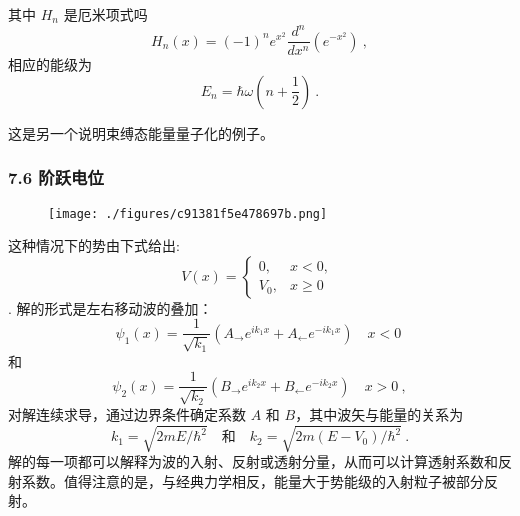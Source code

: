 其中 $H_n$ 是厄米项式吗
$$H_n(x) = (-1)^n e^{x^2} \frac{d^n}{dx^n} \left(e^{-x^2}\right)~,$$
相应的能级为
$$E_n = \hbar \omega \left(n + \frac{1}{2}\right)~.$$

这是另一个说明束缚态能量量子化的例子。

\subsubsection{7.6 阶跃电位}
\begin{figure}[ht]
\centering
\texttt{[image: ./figures/c91381f5e478697b.png]}
\caption \label{fig_LZLX_10}
\end{figure}
这种情况下的势由下式给出:
$$V(x) = \begin{cases} 0, & x < 0, \\V_0, & x \geq 0\end{cases}~$$.
解的形式是左右移动波的叠加：
$$\psi_1(x) = \frac{1}{\sqrt{k_1}} \left(A_{\rightarrow} e^{ik_1 x} + A_{\leftarrow} e^{-ik_1 x}\right) \quad x < 0~$$
和
$$\psi_2(x) = \frac{1}{\sqrt{k_2}} \left(B_{\rightarrow} e^{ik_2 x} + B_{\leftarrow} e^{-ik_2 x}\right) \quad x > 0~,$$
对解连续求导，通过边界条件确定系数 $A$ 和 $B$，其中波矢与能量的关系为
$$k_1 = \sqrt{2mE/\hbar^2} \quad \text{和} \quad k_2 = \sqrt{2m(E - V_0)/\hbar^2}~.$$
解的每一项都可以解释为波的入射、反射或透射分量，从而可以计算透射系数和反射系数。值得注意的是，与经典力学相反，能量大于势能级的入射粒子被部分反射。

